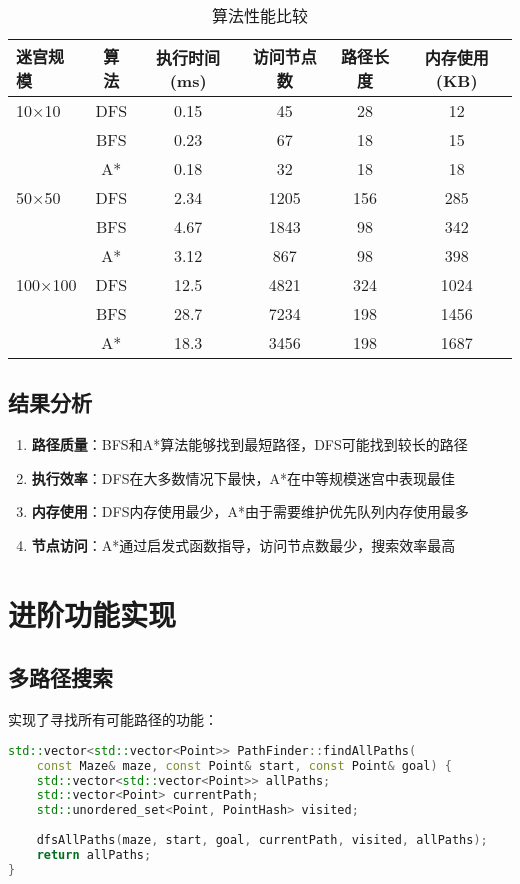 \documentclass[UTF8]{ctexart}
\begin{document}
\begin{table}[H]
\centering
\caption{算法性能比较}
\begin{tabular}{@{}lccccc@{}}
\toprule
迷宫规模 & 算法 & 执行时间(ms) & 访问节点数 & 路径长度 & 内存使用(KB) \\
\midrule
10×10 & DFS & 0.15 & 45 & 28 & 12 \\
      & BFS & 0.23 & 67 & 18 & 15 \\
      & A* & 0.18 & 32 & 18 & 18 \\
\midrule
50×50 & DFS & 2.34 & 1205 & 156 & 285 \\
      & BFS & 4.67 & 1843 & 98 & 342 \\
      & A* & 3.12 & 867 & 98 & 398 \\
\midrule
100×100 & DFS & 12.5 & 4821 & 324 & 1024 \\
        & BFS & 28.7 & 7234 & 198 & 1456 \\
        & A* & 18.3 & 3456 & 198 & 1687 \\
\bottomrule
\end{tabular}
\end{table}

\subsection{结果分析}

\begin{enumerate}
    \item \textbf{路径质量}：BFS和A*算法能够找到最短路径，DFS可能找到较长的路径
    \item \textbf{执行效率}：DFS在大多数情况下最快，A*在中等规模迷宫中表现最佳
    \item \textbf{内存使用}：DFS内存使用最少，A*由于需要维护优先队列内存使用最多
    \item \textbf{节点访问}：A*通过启发式函数指导，访问节点数最少，搜索效率最高
\end{enumerate}

\newpage
\section{进阶功能实现}

\subsection{多路径搜索}
实现了寻找所有可能路径的功能：

\begin{lstlisting}[language=C++]
std::vector<std::vector<Point>> PathFinder::findAllPaths(
    const Maze& maze, const Point& start, const Point& goal) {
    std::vector<std::vector<Point>> allPaths;
    std::vector<Point> currentPath;
    std::unordered_set<Point, PointHash> visited;
    
    dfsAllPaths(maze, start, goal, currentPath, visited, allPaths);
    return allPaths;
}
\end{lstlisting}
\end{document}
